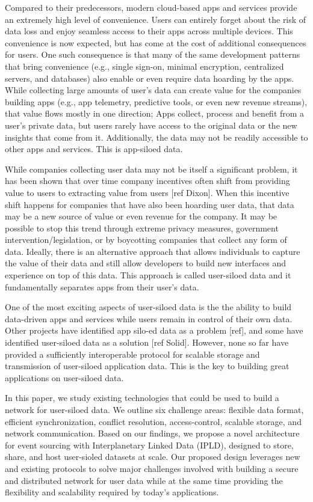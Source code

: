 \documentclass{comjnl}
\begin{document}
Compared to their predecessors, modern cloud-based apps and services provide an extremely high level of convenience. Users can entirely forget about the risk of data loss and enjoy seamless access to their apps across multiple devices. This convenience is now expected, but has come at the cost of additional consequences for users. One such consequence is that many of the same development patterns that bring convenience (e.g., single sign-on, minimal encryption, centralized servers, and databases) also enable or even require data hoarding by the apps. While collecting large amounts of user’s data can create value for the companies building apps (e.g., app telemetry, predictive tools, or even new revenue streams), that value flows mostly in one direction; Apps collect, process and benefit from a user's private data, but users rarely have access to the original data or the new insights that come from it. Additionally,  the data may not be readily accessible to other apps and services. This is app-siloed data.

While companies collecting user data may not be itself a significant problem, it has been shown that over time company incentives often shift from providing value to users to extracting value from users [ref Dixon]. When this incentive shift happens for companies that have also been hoarding user data, that data may be a new source of value or even revenue for the company. It may be possible to stop this trend through extreme privacy measures, government intervention/legislation, or by boycotting companies that collect any form of data. Ideally, there is an alternative approach that allows individuals to capture the value of their data and still allow developers to build new interfaces and experience on top of this data. This approach is called user-siloed data and it fundamentally separates apps from their user’s data.

One of the most exciting aspects of user-siloed data is the the ability to build data-driven apps and services while users remain in control of their own data. Other projects have identified app silo-ed data as a problem [ref], and some have identified user-siloed data as a solution [ref Solid]. However, none so far have provided a sufficiently interoperable protocol for scalable storage and transmission of user-siloed application data. This is the key to building great applications on user-siloed data.

In this paper, we study existing technologies that could be used to build a network for user-siloed data. We outline six challenge areas: flexible data format, efficient synchronization, conflict resolution, access-control, scalable storage, and network communication. Based on our findings, we propose a novel architecture for event sourcing with Interplanetary Linked Data (IPLD), designed to store, share, and host user-sioled datasets at scale. Our proposed design leverages new and existing protocols to solve major challenges involved with building a secure and distributed network for user data while at the same time providing the flexibility and scalability required by today's applications. 
\end{document}
